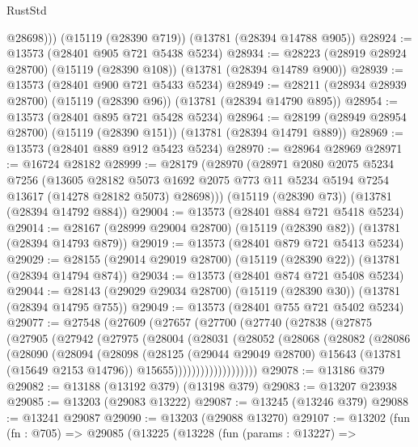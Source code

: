 \begin{lexlean}{RustStd}
\begin{coremodule}
          @28698)))
    (@15119 (@28390 @719))
    (@13781 (@28394 @14788 @905))
@28924 := @13573 (@28401 @905 @721 @5438 @5234)
@28934 := @28223 (@28919 @28924 @28700) (@15119 (@28390 @108)) (@13781 (@28394 @14789 @900))
@28939 := @13573 (@28401 @900 @721 @5433 @5234)
@28949 := @28211 (@28934 @28939 @28700) (@15119 (@28390 @96)) (@13781 (@28394 @14790 @895))
@28954 := @13573 (@28401 @895 @721 @5428 @5234)
@28964 := @28199 (@28949 @28954 @28700) (@15119 (@28390 @151)) (@13781 (@28394 @14791 @889))
@28969 := @13573 (@28401 @889 @912 @5423 @5234)
@28970 := @28964 @28969
@28971 := @16724 @28182
@28999 := @28179
    (@28970
      (@28971
        @2080
        @2075
        @5234
        @7256
        (@13605
          @28182
          @5073
          @1692
          @2075
          @773
          @11
          @5234
          @5194
          @7254
          @13617
          (@14278 @28182 @5073)
          @28698)))
    (@15119 (@28390 @73))
    (@13781 (@28394 @14792 @884))
@29004 := @13573 (@28401 @884 @721 @5418 @5234)
@29014 := @28167 (@28999 @29004 @28700) (@15119 (@28390 @82)) (@13781 (@28394 @14793 @879))
@29019 := @13573 (@28401 @879 @721 @5413 @5234)
@29029 := @28155 (@29014 @29019 @28700) (@15119 (@28390 @22)) (@13781 (@28394 @14794 @874))
@29034 := @13573 (@28401 @874 @721 @5408 @5234)
@29044 := @28143 (@29029 @29034 @28700) (@15119 (@28390 @30)) (@13781 (@28394 @14795 @755))
@29049 := @13573 (@28401 @755 @721 @5402 @5234)
@29077 := @27548
    (@27609
      (@27657
        (@27700
          (@27740
            (@27838
              (@27875
                (@27905
                  (@27942
                    (@27975
                      (@28004
                        (@28031
                          (@28052
                            (@28068
                              (@28082
                                (@28086
                                  (@28090
                                    (@28094
                                      (@28098
                                        (@28125
                                          (@29044 @29049 @28700)
                                          @15643
                                          (@13781 (@15649 @2153 @14796))
                                          @15655)))))))))))))))))))
@29078 := @13186 @379
@29082 := @13188 (@13192 @379) (@13198 @379)
@29083 := @13207 @23938
@29085 := @13203 (@29083 @13222)
@29087 := @13245 (@13246 @379)
@29088 := @13241 @29087
@29090 := @13203 (@29088 @13270)
@29107 := @13202
    (fun (fn : @705) =>
    @29085
      (@13225
        (@13228
          (fun (params : @13227) =>

\end{coremodule}
\end{lexlean}
